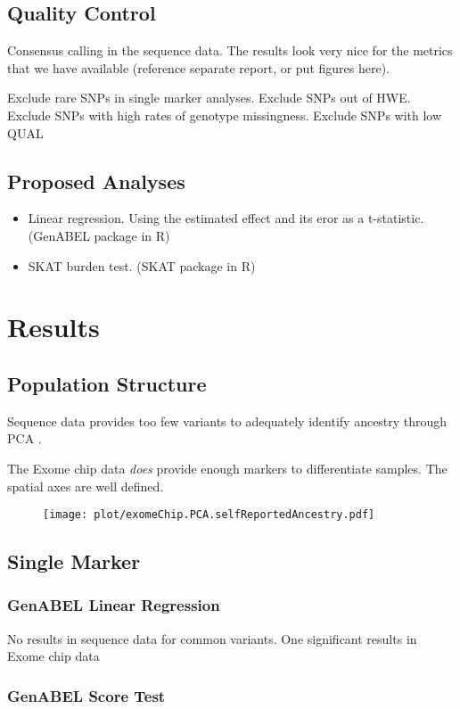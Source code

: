 \documentclass[paper=a4, fontsize=11pt]{scrartcl}	%
\numberwithin{equation}{section}		%
\numberwithin{figure}{section}			%
\numberwithin{table}{section}				%
\begin{document}
	\subsection{Quality Control}
	Consensus calling in the sequence data. The results look very nice for the metrics that we have available (reference separate report, or put figures here).
	
	Exclude rare SNPs in single marker analyses.
	Exclude SNPs out of HWE.
	Exclude SNPs with high rates of genotype missingness.
	Exclude SNPs with low QUAL

	\subsection{Proposed Analyses}
	\begin{itemize}
		\item Linear regression. Using the estimated effect and its eror as a t-statistic. (GenABEL package in R)
		\item SKAT burden test. (SKAT package in R)
	\end{itemize}

\section{Results}

	\subsection{Population Structure}
Sequence data provides too few variants to adequately identify ancestry through PCA .

The Exome chip data \emph{does} provide enough markers to differentiate samples. The spatial axes are well defined.

\begin{figure}
\centering
\texttt{[image: plot/exomeChip.PCA.selfReportedAncestry.pdf]}
\end{figure}


	\subsection{Single Marker}
		\subsubsection{GenABEL Linear Regression}
		No results in sequence data for common variants.
		One significant results in Exome chip data
		\subsubsection{GenABEL Score Test}
\end{document}

